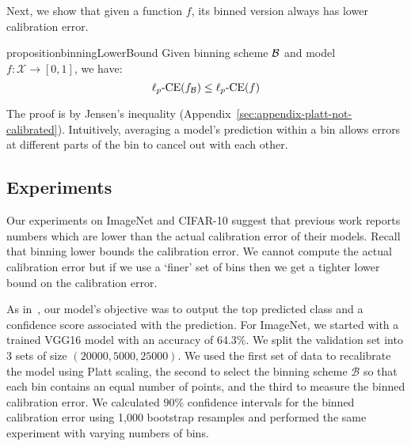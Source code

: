 Next, we show that given a function $f$, its binned version always has lower calibration error.



\begin{restatable}{proposition}{binningLowerBound}
\label{prop:bin_low_bound}
  Given binning scheme $\mathcal{B}{}$ and model $f : \mathcal{X} \to [0, 1]$, we have:
\[  \ell_p\mbox{-CE}(f_{\mathcal{B}{}}) \leq \ell_p\mbox{-CE}(f) \]
\end{restatable}

The proof is by Jensen's inequality (Appendix~\ref{sec:appendix-platt-not-calibrated}). Intuitively, averaging a model's prediction within a bin allows errors at different parts of the bin to cancel out with each other. 

\subsection{Experiments}

Our experiments on ImageNet and CIFAR-10 suggest that previous work reports numbers which are lower than the actual calibration error of their models. Recall that binning lower bounds the calibration error. We cannot compute the actual calibration error but if we use a `finer' set of bins then we get a tighter lower bound on the calibration error.

As in~\cite{guo2017calibration}, our model's objective was to output the top predicted class and a confidence score associated with the prediction. For ImageNet, we started with a trained VGG16 model with an accuracy of 64.3\%. We split the validation set into 3 sets of size $(20000, 5000, 25000)$. We used the first set of data to recalibrate the model using Platt scaling, the second to select the binning scheme $\mathcal{B}$ so that each bin contains an equal number of points, and the third to measure the binned calibration error. We calculated $90\%$ confidence intervals for the binned calibration error using 1,000 bootstrap resamples and performed the same experiment with varying numbers of bins.


